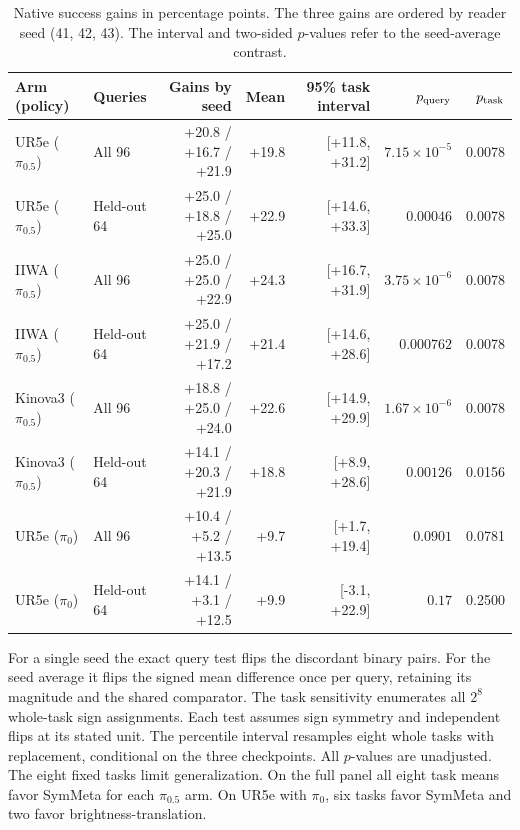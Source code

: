 \documentclass{article}
\theoremstyle{plain}
\theoremstyle{remark}
\begin{document}
\begin{table}[H]
\centering\small
\caption{Native success gains in percentage points. The three gains are ordered by reader seed (41, 42, 43). The interval and two-sided $p$-values refer to the seed-average contrast.}
\begin{tabular}{llrrrrr}
\hline
Arm (policy) & Queries & Gains by seed & Mean & 95\% task interval & $p_{\rm query}$ & $p_{\rm task}$ \\
\hline
UR5e ($\pi_{0.5}$) & All 96 & +20.8 / +16.7 / +21.9 & +19.8 & [+11.8, +31.2] & $7.15\times10^{-5}$ & 0.0078 \\
UR5e ($\pi_{0.5}$) & Held-out 64 & +25.0 / +18.8 / +25.0 & +22.9 & [+14.6, +33.3] & $0.00046$ & 0.0078 \\
IIWA ($\pi_{0.5}$) & All 96 & +25.0 / +25.0 / +22.9 & +24.3 & [+16.7, +31.9] & $3.75\times10^{-6}$ & 0.0078 \\
IIWA ($\pi_{0.5}$) & Held-out 64 & +25.0 / +21.9 / +17.2 & +21.4 & [+14.6, +28.6] & $0.000762$ & 0.0078 \\
Kinova3 ($\pi_{0.5}$) & All 96 & +18.8 / +25.0 / +24.0 & +22.6 & [+14.9, +29.9] & $1.67\times10^{-6}$ & 0.0078 \\
Kinova3 ($\pi_{0.5}$) & Held-out 64 & +14.1 / +20.3 / +21.9 & +18.8 & [+8.9, +28.6] & $0.00126$ & 0.0156 \\
UR5e ($\pi_0$) & All 96 & +10.4 / +5.2 / +13.5 & +9.7 & [+1.7, +19.4] & $0.0901$ & 0.0781 \\
UR5e ($\pi_0$) & Held-out 64 & +14.1 / +3.1 / +12.5 & +9.9 & [-3.1, +22.9] & $0.17$ & 0.2500 \\
\hline
\end{tabular}
\end{table}

For a single seed the exact query test flips the discordant binary pairs. For the seed average it flips the signed mean difference once per query, retaining its magnitude and the shared comparator. The task sensitivity enumerates all $2^8$ whole-task sign assignments. Each test assumes sign symmetry and independent flips at its stated unit. The percentile interval resamples eight whole tasks with replacement, conditional on the three checkpoints. All $p$-values are unadjusted. The eight fixed tasks limit generalization. On the full panel all eight task means favor SymMeta for each $\pi_{0.5}$ arm. On UR5e with $\pi_0$, six tasks favor SymMeta and two favor brightness-translation.
\end{document}
